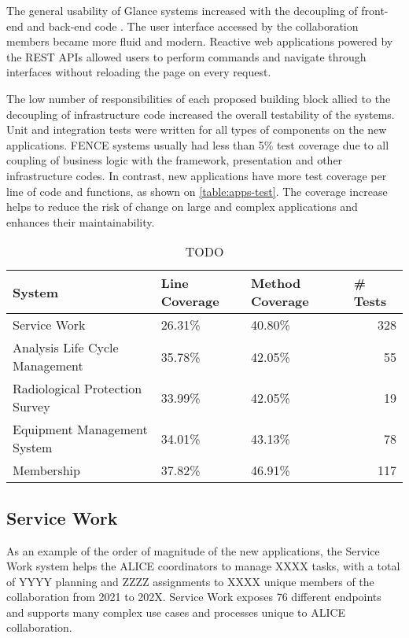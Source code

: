 The general usability of Glance systems increased with the decoupling of front-end and back-end code \cite{de-jesus-tcc}. The user interface accessed by the collaboration members became more fluid and modern. Reactive web applications powered by the REST APIs allowed users to perform commands and navigate through interfaces without reloading the page on every request.  

The low number of responsibilities of each proposed building block allied to the decoupling of infrastructure code increased the overall testability of the systems. Unit and integration tests were written for all types of components on the new applications. FENCE systems usually had less than 5\% test coverage due to all coupling of business logic with the framework, presentation and other infrastructure codes. In contrast, new applications have more test coverage per line of code and functions, as shown on \autoref{table:apps-test}. The coverage increase helps to reduce the risk of change on large and complex applications and enhances their maintainability.

\begin{table}[htbp]
\begin{tabular}{|l|l|l|r|}
\hline
System                         & Line Coverage & Method Coverage & \multicolumn{1}{l|}{\# Tests} \\ \hline
Service Work                   & 26.31\%       & 40.80\%         & 328                           \\ 
Analysis Life Cycle Management & 35.78\%       & 42.05\%         & 55                            \\ 
Radiological Protection Survey & 33.99\%       & 42.05\%         & 19                            \\ 
Equipment Management System    & 34.01\%       & 43.13\%         & 78                            \\ 
Membership                     & 37.82\%       & 46.91\%         & 117                           \\ \hline
\end{tabular}
\caption{TODO}
\label{table:apps-test}
\end{table}

\subsection{Service Work}

As an example of the order of magnitude of the new applications, the Service Work system helps the ALICE coordinators to manage XXXX tasks, with a total of YYYY planning and ZZZZ assignments to XXXX unique members of the collaboration from 2021 to 202X. Service Work exposes 76 different endpoints and supports many complex use cases and processes unique to ALICE collaboration.

